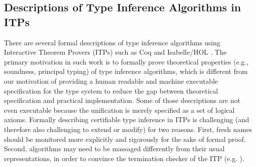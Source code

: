 \subsection{Descriptions of Type Inference Algorithms in ITPs}
There are several formal descriptions of type inference algorithms using
Interactive Theorem Provers (ITPs) such as Coq \cite{Dubois00} and
Isabelle/HOL \cite{UrbanN2009}. The primary motivation %
in such work is to formally prove theoretical properties (e.g., soundness,
principal typing) of type inference algorithms, which is different from
our motivation of providing a human readable and machine executable
specification for the type system to reduce the gap between
theoretical specification and practical implementation. Some of those
descriptions  are not even executable because the unification is merely
specified as a set of logical axioms.
Formally describing certifiable type inference in ITPs is challenging
(and therefore also challenging to extend or modify) for two reasons.
First, fresh names should be monitored more explicitly and rigorously for
the sake of formal proof. Second, algorithms may need to be massaged
differently from their usual representations, in order to convince
the termination checker of the ITP (e.g. \cite{JFP:185139}).

